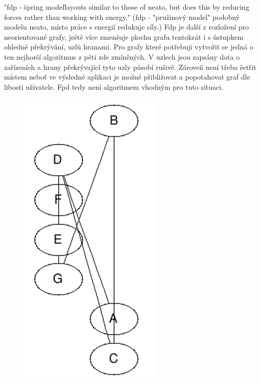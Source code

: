 \documentclass[color,table,oneside,nolot,nolof]{fithesis}
\begin{document}
	"fdp - \"spring model\" layouts similar to those of neato, but does this by reducing forces rather than working with energy."\cite{graphviz_layout} (fdp - "pružinový model" podobný
	modelu neato, místo práce s energií redukuje síly.) Fdp je další z rozložení pro neorientované grafy, ještě více zmenšuje plochu grafu tentokrát i s ústupkem ohledně překrývání,
	uzlů hranami. Pro grafy které potřebuji vytvořit se jedná o ten nejhorší algoritmus z pěti zde zmíněných. V uzlech jsou zapsány data o zařízeních a hrany překrývající tyto uzly
	působí rušivě. Zároveň není třeba šetřit místem neboť ve výsledné aplikaci je možné přibližovat a popotahovat graf dle libosti uživatele. Fpd tedy není algoritmem vhodným pro tuto
	situaci.
\begin{figure}
	\centering
	\includegraphics[width=0.6\textwidth]{pictures/fdp_example.png} 
\end{figure}
\end{document}
